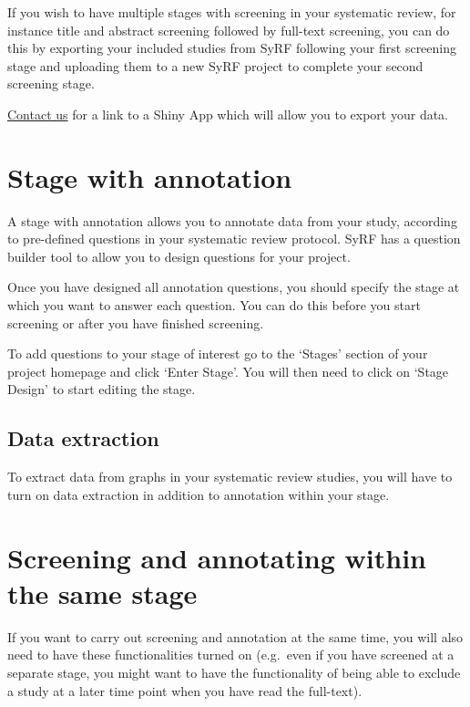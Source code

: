 \documentclass[
]{book}
\begin{document}
If you wish to have multiple stages with screening in your systematic review, for instance title and abstract screening followed by full-text screening, you can do this by exporting your included studies from SyRF following your first screening stage and uploading them to a new SyRF project to complete your second screening stage.

\href{mailto:syrf.info@ed.ac.uk}{Contact us} for a link to a Shiny App which will allow you to export your data.

\hypertarget{stage-with-annotation}{%
\section{Stage with annotation}\label{stage-with-annotation}}

A stage with annotation allows you to annotate data from your study, according to pre-defined questions in your systematic review protocol. SyRF has a question builder tool to allow you to design questions for your project.

Once you have designed all annotation questions, you should specify the stage at which you want to answer each question. You can do this before you start screening or after you have finished screening.

To add questions to your stage of interest go to the `Stages' section of your project homepage and click `Enter Stage'. You will then need to click on `Stage Design' to start editing the stage.

\hypertarget{data-extraction-1}{%
\subsection{Data extraction}\label{data-extraction-1}}

To extract data from graphs in your systematic review studies, you will have to turn on data extraction in addition to annotation within your stage.

\hypertarget{screening-and-annotating-within-the-same-stage}{%
\section{Screening and annotating within the same stage}\label{screening-and-annotating-within-the-same-stage}}

If you want to carry out screening and annotation at the same time, you will also need to have these functionalities turned on (e.g.~even if you have screened at a separate stage, you might want to have the functionality of being able to exclude a study at a later time point when you have read the full-text).
\end{document}
